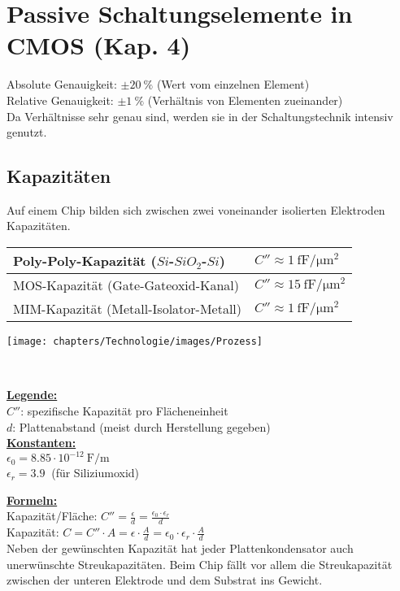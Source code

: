 \section{Passive Schaltungselemente in CMOS (Kap. 4)}
\begin{minipage}[c]{0.59\textwidth}
	Absolute Genauigkeit: $\pm \SI{20}{\percent}$ (Wert vom einzelnen Element)\\
	Relative Genauigkeit: $\pm \SI{1}{\percent}$ (Verhältnis von Elementen zueinander) \\
	Da Verhältnisse sehr genau sind, werden sie in der Schaltungstechnik intensiv genutzt. 
	\subsection{Kapazitäten}
	Auf einem Chip bilden sich zwischen zwei voneinander isolierten Elektroden Kapazitäten. \\
	\begin{tabular}{|l|l|}
		\hline
		Poly-Poly-Kapazität ($Si$-$SiO_2$-$Si$) & $C'' \approx \SI{1}{\femto \farad \per \micro \meter ^2}$\\ \hline
		MOS-Kapazität (Gate-Gateoxid-Kanal) & $C'' \approx \SI{15}{\femto \farad \per \micro \meter ^2}$\\ \hline
		MIM-Kapazität (Metall-Isolator-Metall) & $C'' \approx \SI{1}{\femto \farad \per \micro \meter ^2}$ \\ \hline
	\end{tabular}
\end{minipage}
\begin{minipage}[c]{0.41\textwidth}
	\texttt{[image: chapters/Technologie/images/Prozess]}
\end{minipage} \\ [1ex]
\begin{minipage}[c]{0.45\textwidth}
	\uline{\textbf{Legende:}}\\
	$C''$: spezifische Kapazität pro Flächeneinheit\\
	$d$:   Plattenabstand (meist durch Herstellung gegeben) \\
	\uline{\textbf{Konstanten:}}\\
	$\epsilon_0 = 8.85 \cdot 10^{-12} \SI{}{\farad / \meter}$\\
	$\epsilon_r = \SI{3.9}{}$ (für Siliziumoxid)
\end{minipage}
\begin{minipage}[c]{0.55\textwidth}
	\uline{\textbf{Formeln:}}\\
	Kapazität/Fläche: $C'' = \frac{\epsilon}{d} = \frac{\epsilon_0 \cdot \epsilon_r}{d}$\\
	Kapazität: \hspace{11.5mm}$C = C'' \cdot A = \epsilon\cdot\frac{A}{d}=\epsilon_0\cdot\epsilon_r\cdot\frac{A}{d}$ \\
	Neben der gewünschten Kapazität hat jeder Plattenkondensator auch unerwünschte Streukapazitäten. 
	Beim Chip fällt vor allem die Streukapazität zwischen der unteren Elektrode und dem Substrat ins Gewicht.
\end{minipage}

